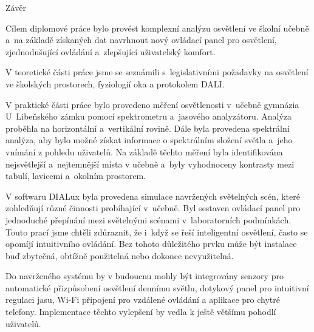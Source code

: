 \chap Závěr

Cílem diplomové práce bylo provést komplexní analýzu osvětlení ve školní učebně a~na základě získaných dat
navrhnout nový ovládací panel pro osvětlení, zjednodušující ovládání a~zlepšující uživatelský komfort.

V teoretické části práce jsme se seznámili s~legislativními požadavky na osvětlení ve školských prostorech,
fyziologií oka a protokolem DALI.

V praktické části práce bylo provedeno měření osvětlenosti v~učebně gymnázia U~Libeňského zámku pomocí spektrometru
a~jasového analyzátoru. Analýza proběhla na horizontální a~vertikální rovině. Dále byla provedena spektrální analýza,
aby bylo možné získat informace o spektrálním složení světla a~jeho vnímání z pohledu uživatelů. Na základě těchto měření
byla identifikována nejsvětlejší a~nejtemnější místa v učebně a~byly vyhodnoceny kontrasty mezi tabulí, lavicemi
a~okolním prostorem.

V softwaru DIALux byla provedena simulace navržených světelných scén, které zohledňují různé činnosti probíhající v~učebně.
Byl sestaven ovládací panel pro jednoduché přepínání mezi světelnými scénami v~laboratorních podmínkách.
Touto prací jsme chtěli zdůraznit, že i~když se řeší inteligentní osvětlení, často se opomíjí 
intuitivního ovládání. Bez tohoto důležitého prvku může být instalace buď zbytečná, obtížně použitelná nebo dokonce nevyužitelná.

Do navrženého systému by v budoucnu mohly být integrovány senzory pro automatické přizpůsobení osvětlení dennímu světlu,
dotykový panel pro intuitivní regulaci jasu, Wi-Fi připojení pro vzdálené ovládání a aplikace pro chytré telefony.
Implementace těchto vylepšení by vedla k ještě většímu pohodlí uživatelů.
















